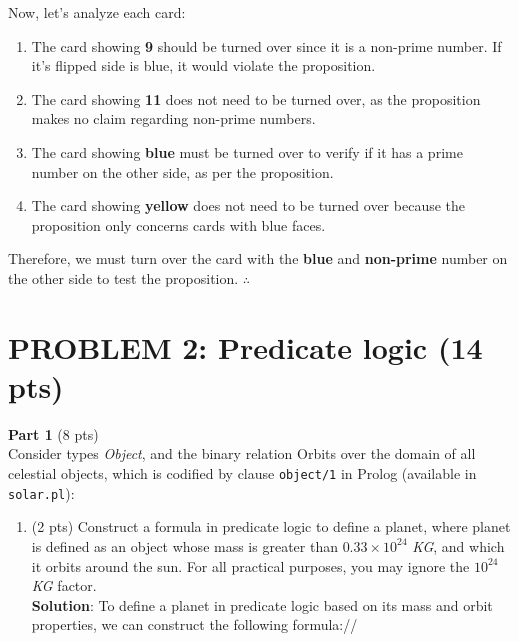 \documentclass[12pt]{article}
\begin{document}
\begin{spacing}{1.5}
	Now, let's analyze each card:
	\begin{enumerate}
		\item The card showing \textbf{9} should be turned over since it is a non-prime number. If it's flipped side is blue, it would violate the proposition.
		\item The card showing \textbf{11} does not need to be turned over, as the proposition makes no claim regarding non-prime numbers.
		\item The card showing \textbf{blue} must be turned over to verify if it has a prime number on the other side, as per the proposition.
		\item The card showing \textbf{yellow} does not need to be turned over because the proposition only concerns cards with blue faces.\\
	\end{enumerate}
											
	Therefore, we must turn over the card with the \textbf{blue} and \textbf{non-prime} number on the other side to test the proposition. $\therefore$
											
	\newpage
											
							
	\newpage
						    
	\section*{PROBLEM 2: Predicate logic (14 pts)}
											
	\textbf{Part 1} (8 pts)\\
	Consider types \textit{Object}, and the binary relation Orbits over the domain of all celestial objects,
	which is codified by clause \texttt{object/1} in Prolog (available in \texttt{solar.pl}):
										
	\begin{enumerate}
		\item 
		      (2 pts) Construct a formula in predicate logic to define a planet, where planet is defined
		      as an object whose mass is greater than $0.33\times10^{24}$ \textit{KG}, and which it orbits around the
		      sun. For all practical purposes, you may ignore the $10^{24}$ \textit{KG} factor.\\
		      		      		      		      		      		      		      		      		      
		      \textbf{Solution}: To define a planet in predicate logic based on its mass and orbit properties, we can construct the following formula://
		      		      		      		      		      		      		      		      		      

\end{enumerate}
\end{spacing}
\end{document}

